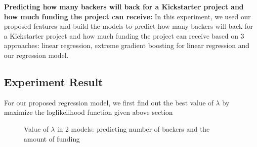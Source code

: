 \textbf{Predicting how many backers will back for a Kickstarter project and how much funding the project can receive:} In this experiment, we used our proposed features and build the models to predict how many backers will back for a Kickstarter project and how much funding the project can receive based on 3 approaches: linear regression, extreme gradient boosting for linear regression and our regression model. 
\subsection{Experiment Result}
For our proposed regression model, we first find out the best value of $\lambda$ by maximize the loglikelihood function given above section

\begin{figure}%
	\centering
	\hspace{1cm}
	\caption{Value of $\lambda$ in 2 models: predicting number of backers and the amount of funding}
	\label{fig:LambdaFig}
	\vspace{-10pt}
\end{figure}

